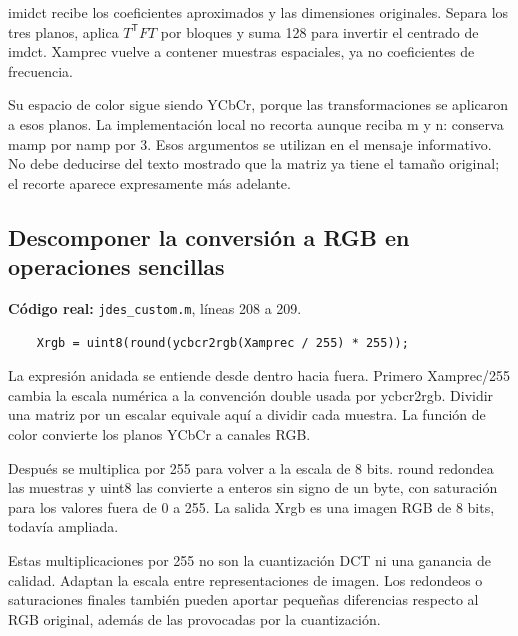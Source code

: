 \documentclass[11pt,a4paper,oneside]{report}
\begin{document}
imidct recibe los coeficientes aproximados y las dimensiones originales.
Separa los tres planos, aplica $T^{\mathsf T}FT$ por bloques y suma 128
para invertir el centrado de imdct. Xamprec vuelve a contener muestras
espaciales, ya no coeficientes de frecuencia.

Su espacio de color sigue siendo YCbCr, porque las transformaciones se
aplicaron a esos planos. La implementación local no recorta aunque reciba
m y n: conserva mamp por namp por 3. Esos argumentos se utilizan en el
mensaje informativo. No debe deducirse del texto mostrado que la matriz
ya tiene el tamaño original; el recorte aparece expresamente más adelante.


\par\medskip\noindent\begin{minipage}{\linewidth}

\subsection{Descomponer la conversión a RGB en operaciones sencillas}

\textbf{Código real:} \texttt{jdes\_custom.m}, líneas 208 a 209.

\begin{lstlisting}[firstnumber=208]
    % PASO 12: convertir a RGB, recortar y guardar.
    Xrgb = uint8(round(ycbcr2rgb(Xamprec / 255) * 255));
\end{lstlisting}

\end{minipage}\par


La expresión anidada se entiende desde dentro hacia fuera. Primero
Xamprec/255 cambia la escala numérica a la convención double usada por
ycbcr2rgb. Dividir una matriz por un escalar equivale aquí a dividir cada
muestra. La función de color convierte los planos YCbCr a canales RGB.

Después se multiplica por 255 para volver a la escala de 8 bits. round
redondea las muestras y uint8 las convierte a enteros sin signo de un byte,
con saturación para los valores fuera de 0 a 255. La salida Xrgb es una
imagen RGB de 8 bits, todavía ampliada.

Estas multiplicaciones por 255 no son la cuantización DCT ni una ganancia
de calidad. Adaptan la escala entre representaciones de imagen. Los redondeos
o saturaciones finales también pueden aportar pequeñas diferencias respecto
al RGB original, además de las provocadas por la cuantización.
\end{document}
